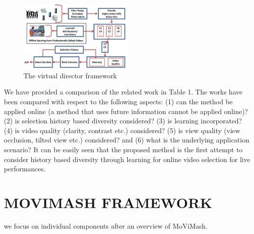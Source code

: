 \documentclass{sig-alternate}
\begin{document}
\begin{figure}[h]
    \centering
    \includegraphics[width=0.5\textwidth]{img2.png}
    \caption{The virtual director framework}
    \label{fig:mesh2}
\end{figure}

We have provided a comparison of the related work in Table 1. The works have been compared with respect to the following aspects: (1) can the method be applied online (a method that uses future information cannot be applied online)? (2) is selection history based diversity considered? (3) is learning incorporated? (4) is video quality (clarity, contrast etc.) considered? (5) is view quality (view occlusion, tilted view etc.) considered? and (6) what is the underlying application scenario? It can be easily seen that the proposed method is the first attempt to consider history based diversity through learning for online video selection for live performances.
\section {MOVIMASH FRAMEWORK}
 we focus on individual components after an overview of MoViMash.
\end{document}
